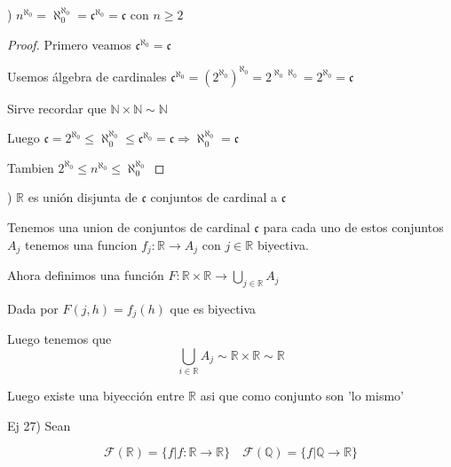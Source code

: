 \documentclass[12pt]{article}
\newcommand{\n}{\aleph_{0}}
\newcommand{\Q}{\mathbb{Q}}
\newcommand{\R}{\mathbb{R}}
\newcommand{\N}{\mathbb{N}}
\newcommand{\Ra}{\Rightarrow}
\newcommand{\ra}{\rightarrow}
\theoremstyle{definition}
\begin{document}
) $n^{\n} = \n^{\n} = \mathfrak{c}^{\n} = \mathfrak{c}$ con $n \geq 2$

\begin{proof}
  Primero veamos $\mathfrak{c}^{\n} = \mathfrak{c}$

  Usemos álgebra de cardinales $\mathfrak{c}^{\n} = (2^{\n})^{\n} = 2^{\n \n} = 2^{\n} = \mathfrak{c} \quad $ 

  Sirve recordar que $\N \times \N \sim \N$

  Luego $\mathfrak{c}  = 2^{\n} \leq \n^{\n} \leq \mathfrak{c}^{\n} = \mathfrak{c} \Ra \n^{\n} = \mathfrak{c}$

  Tambien $2^{\n} \leq n^{\n} \leq \n^{\n}$
\end{proof}

) $\R$ es unión disjunta de $\mathfrak{c}$ conjuntos de cardinal a $\mathfrak{c}$

Tenemos una union de conjuntos de cardinal $\mathfrak{c}$ para cada uno de estos conjuntos $A_{j}$ tenemos una funcion $f_{j} : \R \ra A_{j}$ con $j \in \R$ biyectiva.

Ahora definimos una función $F: \R \times \R \ra \bigcup_{j \in \R} A_{j}$

Dada por $F(j,h) = f_{j}(h)$ que es biyectiva

Luego tenemos que $$\bigcup_{i \in \R} A_{j} \sim \R \times \R \sim \R  $$

Luego existe una biyección entre $\R $ asi que como conjunto son 'lo mismo'

\noindent Ej 27) Sean 

$$ \mathcal{F}(\R) = \{f | f:\R \ra \R \} \quad \mathcal{F}(\Q) = \{f | \Q \ra \R \}$$
\end{document}
